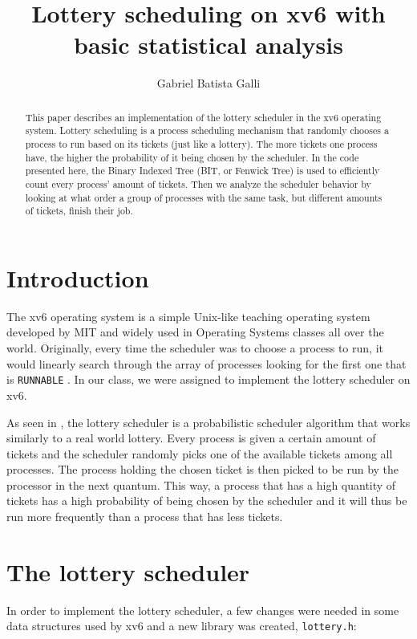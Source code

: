 \documentclass[12pt]{article}
\title{Lottery scheduling on xv6 with basic statistical analysis}
\author{Gabriel Batista Galli\inst{1}}
\begin{document}
\maketitle

\begin{abstract}
This paper describes an implementation of the lottery scheduler in the
xv6 operating system. Lottery scheduling is a process scheduling
mechanism that randomly chooses a process to run based on its tickets
(just like a lottery). The more tickets one process have, the higher the
probability of it being chosen by the scheduler. In the code presented
here, the Binary Indexed Tree (BIT, or Fenwick Tree) is used to
efficiently count every process' amount of tickets. Then we analyze the
scheduler behavior by looking at what order a group of processes with
the same task, but different amounts of tickets, finish their job.
\end{abstract}

\section{Introduction}
The xv6 operating system is a simple Unix-like teaching operating
system developed by MIT and widely used in Operating Systems classes all
over the world. Originally, every time the scheduler was to
choose a process to run, it would linearly search through the array of
processes looking for the first one that is \texttt{RUNNABLE} \cite{xv6book}. In
our class, we were assigned to implement the lottery scheduler on xv6.

As seen in \cite{waldspurger:94}, the lottery scheduler is a
probabilistic scheduler algorithm that works similarly to a real world
lottery. Every process is given a certain amount of tickets and the
scheduler randomly picks one of the available tickets among all
processes. The process holding the chosen ticket is then picked to be
run by the processor in the next quantum. This way, a process that has a
high quantity of tickets has a high probability of being chosen by the
scheduler and it will thus be run more frequently than a process that has less tickets.

\section{The lottery scheduler} \label{sec:lottsched}
In order to implement the lottery scheduler, a few changes were needed in
some data structures used by xv6 and a new library was created, \texttt{lottery.h}:
\end{document}
